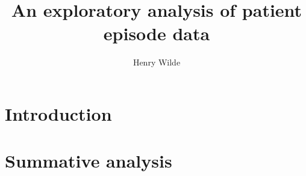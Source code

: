 \documentclass[12pt]{article}
\title{An exploratory analysis of patient episode data}
\author{Henry Wilde}
\begin{document}
\maketitle

\section{Introduction}\label{sec:intro}


\section{Summative analysis}\label{sec:summative}




\end{document}
